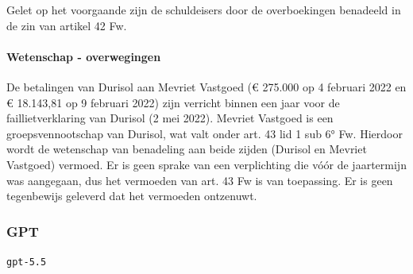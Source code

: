 \documentclass[
  dutch,
  a4paper,
]{article}
\begin{document}
Gelet op het voorgaande zijn de schuldeisers door de overboekingen benadeeld in de zin van artikel 42 Fw.

\paragraph{Wetenschap - overwegingen}\label{wetenschap---overwegingen-15}

De betalingen van Durisol aan Mevriet Vastgoed (€ 275.000 op 4 februari 2022 en € 18.143,81 op 9 februari 2022) zijn verricht binnen een jaar voor de faillietverklaring van Durisol (2 mei 2022). Mevriet Vastgoed is een groepsvennootschap van Durisol, wat valt onder art. 43 lid 1 sub 6° Fw. Hierdoor wordt de wetenschap van benadeling aan beide zijden (Durisol en Mevriet Vastgoed) vermoed. Er is geen sprake van een verplichting die vóór de jaartermijn was aangegaan, dus het vermoeden van art. 43 Fw is van toepassing. Er is geen tegenbewijs geleverd dat het vermoeden ontzenuwt.

\newpage


\subsubsection{GPT}\label{gpt-5}

\texttt{gpt-5.5}
\end{document}
